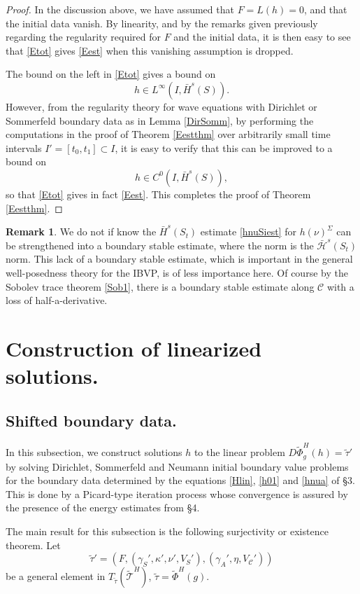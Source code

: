 \documentclass[10pt]{amsart}
\newcommand{\g}{\gamma}
\newcommand{\Si}{\Sigma}
\renewcommand{\k}{\kappa}
\newcommand{\cC}{{\mathcal C}}
\newcommand{\cT}{{\mathcal T}}
\newcommand{\cH}{{\mathcal H}}
\newcommand{\be}{\begin{equation}}
\newcommand{\ee}{\end{equation}}
\newcommand{\<}{\langle}
\renewcommand{\>}{\rangle}
\newcommand{\w}{\widetilde}
\theoremstyle{plain}
\theoremstyle{remark}
\theoremstyle{definition}
\newtheorem{remark}[lemma]{Remark}
\numberwithin{equation}{section}
\begin{document}
\begin{proof}
In the discussion above, we have assumed that $F = L(h) = 0$, and that the initial data vanish. By linearity, and by the remarks given previously regarding the 
regularity required for $F$ and the initial data, it is then easy to see that \eqref{Etot} gives \eqref{Eest} when this vanishing assumption is dropped. 

The bound on the left in \eqref{Etot} gives a bound on 
\be \label{Linf}
h \in L^{\infty}(I, \bar H^s(S)).
\ee
However, from the regularity theory for wave equations with Dirichlet or Sommerfeld boundary data as in Lemma \ref{DirSomm}, by performing the 
computations in the proof of Theorem \ref{Eestthm} over arbitrarily small time intervals $I' = [t_0, t_1] \subset I$, it is easy to verify that this can be improved 
to a bound on 
$$h \in C^0(I, \bar H^s(S)),$$
so that \eqref{Etot} gives in fact \eqref{Eest}. This completes the proof of Theorem \ref{Eestthm}.  

\end{proof}

\begin{remark} 
{\rm We do not if know the $\bar H^s(S_t)$ estimate \eqref{hnuSiest} for $h(\nu)^{\Si}$ can be strengthened into a boundary stable estimate, where the norm is 
the $\bar \cH^s(S_t)$ norm. This lack of a boundary stable estimate, which is important in the general well-posedness theory for the IBVP, 
is of less importance here. Of course by the Sobolev trace theorem \eqref{Sob1}, there is a boundary stable estimate along $\cC$ 
with a loss of half-a-derivative. 
}
\end{remark} 
   
   
\section{Construction of linearized solutions.} 

\subsection{Shifted boundary data.}
In this subsection, we construct solutions $h$ to the linear problem $D\w \Phi_g^H(h) = \w \tau'$ by solving Dirichlet, Sommerfeld and Neumann 
initial boundary value problems for the boundary data determined by the equations \eqref{Hlin}, \eqref{h01} and \eqref{hnua} of \S 3. This is done 
by a Picard-type iteration process whose convergence is assured by the presence of the energy estimates from \S 4. 

     The main result for this subsection is the following surjectivity or existence theorem. Let 
\be \label{tau'1}
\w \tau' = (F, (\g_S', \k', \nu', V_S'), (\g_A', \eta, V_{\cC}')) 
\ee
be a general element in $T_{\w \tau}(\w \cT^H)$, $\w \tau = \w \Phi^H(g)$. 
  
\end{document}
